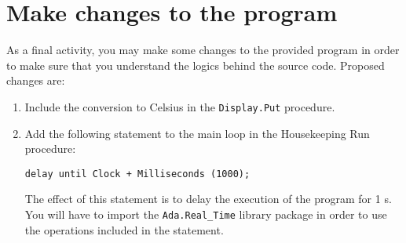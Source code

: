 \section{Make changes to the program}

As a final activity, you may make some changes to the provided program in order to make sure that you understand the logics behind the source code. Proposed changes are:

\begin{enumerate}
\item Include the conversion to Celsius in the {\tt Display.Put} procedure.
\item Add the following statement to the main loop in the Housekeeping Run procedure:

{\tt delay until Clock + Milliseconds (1000);}

The effect of this statement is to delay the execution of the program for 1 s. You will have to import the {\tt Ada.Real\_Time} library package in order to use the operations included in the statement.
\end{enumerate}
